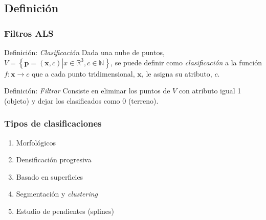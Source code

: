 \subsection{Definición}
\begin{frame}[label=filter_def]
    \frametitle{Filtros ALS}
    \begin{beamerboxesrounded}[shadow=true]{Definición: \emph{Clasificación}}
      Dada una nube de puntos,$V = \left\lbrace \mathbf{p}=\left(\mathbf{x},c\right) 
      \left| x \in \mathbb{R}^3, c \in \mathbb{N} \right. \right\rbrace $, se 
      puede definir como \alert{\emph{clasificación}} a la función $f: \mathbf{x} \to c$ 
      que a cada punto tridimensional, $\mathbf{x}$, le asigna su atributo, $c$.
    \end{beamerboxesrounded}


    \begin{beamerboxesrounded}[shadow=true]{Definición: \emph{Filtrar}}
     Consiste en \alert<4>{eliminar} los puntos de $V$ con atributo igual 1 (objeto) y dejar los clasificados como 0 (terreno).
    \end{beamerboxesrounded}
\end{frame}
\begin{frame}
    \frametitle{Tipos de clasificaciones}
    \begin{enumerate}
        \item Morfológicos
        \item Densificación progresiva
        \item Basado en superficies
        \item Segmentación y \emph{clustering}
        \item Estudio de pendientes (splines)
    \end{enumerate}
\end{frame}
